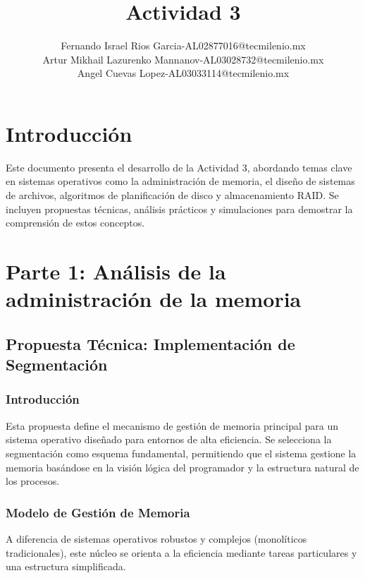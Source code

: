 \documentclass[stu, 12pt, letterpaper, donotrepeattitle, floatsintext, noapacite]{apa7}
\title{Actividad 3}
\author{Fernando Israel Rios Garcia-AL02877016@tecmilenio.mx \\
Artur Mikhail Lazurenko Mannanov-AL03028732@tecmilenio.mx \\
Angel Cuevas Lopez-AL03033114@tecmilenio.mx}
\affiliation{Universidad Tecmilenio}
\begin{document}
\maketitle

\setcounter{tocdepth}{3}
\setcounter{secnumdepth}{3}
\tableofcontents
\listoffigures
\newpage

\section{Introducción}
Este documento presenta el desarrollo de la Actividad 3, abordando temas clave en sistemas operativos como la administración de memoria, el diseño de sistemas de archivos, algoritmos de planificación de disco y almacenamiento RAID. Se incluyen propuestas técnicas, análisis prácticos y simulaciones para demostrar la comprensión de estos conceptos.

\section{Parte 1: Análisis de la administración de la memoria}

\subsection{Propuesta Técnica: Implementación de Segmentación}

\subsubsection{Introducción}
Esta propuesta define el mecanismo de gestión de memoria principal para un sistema operativo diseñado para entornos de alta eficiencia. Se selecciona la segmentación como esquema fundamental, permitiendo que el sistema gestione la memoria basándose en la visión lógica del programador y la estructura natural de los procesos.

\subsubsection{Modelo de Gestión de Memoria}
A diferencia de sistemas operativos robustos y complejos (monolíticos tradicionales), este núcleo se orienta a la eficiencia mediante tareas particulares y una estructura simplificada.
\end{document}
